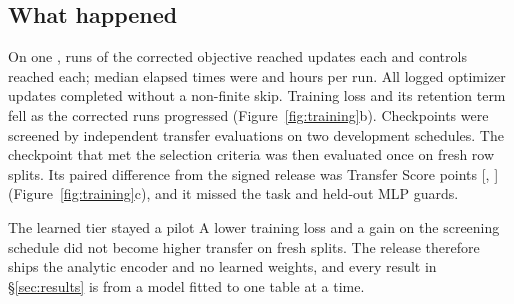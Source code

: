 \documentclass[10pt,letterpaper,twocolumn]{article}
\begin{document}
\subsection{What happened}
On one \TrainingGpu{},  runs of the corrected objective reached  updates each and  controls reached  each; median elapsed times were  and  hours per run. All  logged optimizer updates completed without a non-finite skip. Training loss and its retention term fell as the corrected runs progressed (Figure~\ref{fig:training}b). Checkpoints were screened by independent transfer evaluations on two development schedules. The checkpoint that met the selection criteria was then evaluated once on fresh row splits. Its paired difference from the signed release was  Transfer Score points [, ] (Figure~\ref{fig:training}c), and it missed the task and held-out MLP guards.

\begin{callout}{The learned tier stayed a pilot}
A lower training loss and a gain on the screening schedule did not become higher transfer on fresh splits. The release therefore ships the analytic encoder and no learned weights, and every result in \S\ref{sec:results} is from a model fitted to one table at a time.
\end{callout}
\end{document}
